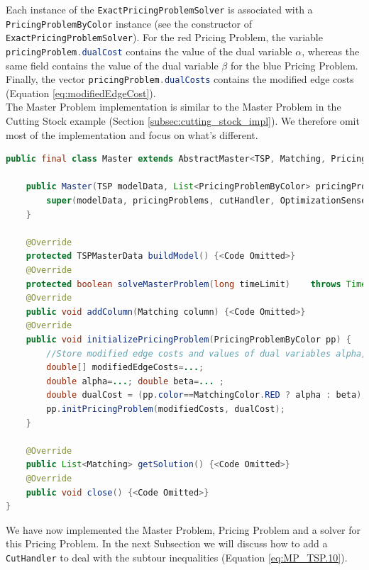 \documentclass[a4paper]{article}
\newenvironment{myblock}[1]{%
    \tcolorbox[beamer,%
    noparskip,breakable,
    colback=lightBlueCodeBlock,colframe=darkBlueCodeBlock,%
    colbacklower=darkBlueCodeBlock!75!lightBlueCodeBlock,%
    coltitle=blueTitleCodeBlock,
    title=#1]}%
    {\endtcolorbox}
\newcommand{\code}[1]{\lstinline[language=java, style=seminar]!#1!}
\begin{document}
Each instance of the \code{ExactPricingProblemSolver} is associated with a \code{PricingProblemByColor} instance (see the constructor of \code{ExactPricingProblemSolver}). For the red Pricing Problem, the variable \code{pricingProblem.dualCost} contains the value of the dual variable $\alpha$, whereas the same field contains the value of the dual variable $\beta$ for the blue Pricing Problem. Finally, the vector \code{pricingProblem.dualCosts} contains the modified edge costs (Equation \eqref{eq:modifiedEdgeCost}).\\
The Master Problem implementation is similar to the Master Problem in the Cutting Stock example (Section \ref{subsec:cutting_stock_impl}). We therefore omit most of the implementation and focus on what's different. 
\begin{myblock}{Master}
\begin{lstlisting}[language=java, style=eclipseArticle, xleftmargin=2em]  
public final class Master extends AbstractMaster<TSP, Matching, PricingProblemByColor, TSPMasterData> {

	public Master(TSP modelData, List<PricingProblemByColor> pricingProblems, CutHandler<TSP, TSPMasterData> cutHandler) {
		super(modelData, pricingProblems, cutHandler, OptimizationSense.MINIMIZE);
	}

	@Override
	protected TSPMasterData buildModel() {<Code Omitted>}
	@Override
	protected boolean solveMasterProblem(long timeLimit)	throws TimeLimitExceededException {<Code Omitted>}
	@Override
	public void addColumn(Matching column) {<Code Omitted>}
	@Override
	public void initializePricingProblem(PricingProblemByColor pp) {
		//Store modified edge costs and values of dual variables alpha, beta in PricingProblemByColor object
		double[] modifiedEdgeCosts=...;
		double alpha=...; double beta=... ;
		double dualCost = (pp.color==MatchingColor.RED ? alpha : beta);
		pp.initPricingProblem(modifiedCosts, dualCost);
	}

	@Override
	public List<Matching> getSolution() {<Code Omitted>}
	@Override
	public void close() {<Code Omitted>}
}
\end{lstlisting}
\end{myblock}
We have now implemented the Master Problem, Pricing Problem and a solver for this Pricing Problem. In the next Subsection we will discuss how to add a \code{CutHandler} to deal with the subtour inequalities (Equation \ref{eq:MP_TSP.10}).
\end{document}
